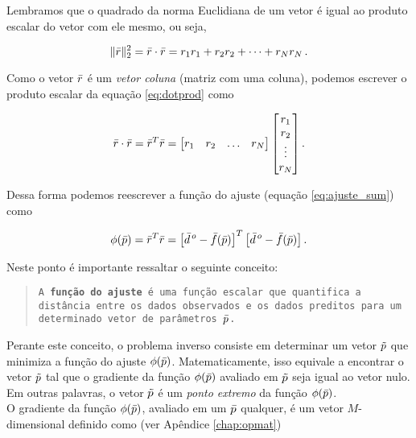 \indent Lembramos que o quadrado da norma Euclidiana de um vetor é igual ao
produto escalar do vetor com ele mesmo, ou seja,

\begin{equation}
\lVert\bar{r}\rVert_2^2 = \bar{r} \cdot \bar{r} =
    r_1r_1 + r_2r_2 + \dotsb + r_Nr_N \thinspace .
\label{eq:dotprod}
\end{equation}

\noindent Como o vetor $\bar{r}$ é um {\it vetor coluna} (matriz com uma
coluna), podemos escrever o produto escalar da equação \ref{eq:dotprod} como

\begin{equation}
\bar{r} \cdot \bar{r} = \bar{r}^T \bar{r} =
    \begin{bmatrix}
        r_1 & r_2 & \ldots & r_N
    \end{bmatrix}
    \begin{bmatrix}
        r_1 \\ r_2 \\ \vdots \\ r_N
    \end{bmatrix} .
\label{eq:vectdotprod}
\end{equation}

\noindent Dessa forma podemos reescrever a função do ajuste (equação
\ref{eq:ajuste_sum}) como

\begin{equation}
\phi(\bar{p}) = \bar{r}^T \bar{r} =
    \left[\bar{d}^{\thinspace o} - \bar{f}(\bar{p})\right]^T
    \left[\bar{d}^{\thinspace o} - \bar{f}(\bar{p})\right] .
\label{eq:ajuste}
\end{equation}

\indent Neste ponto é importante ressaltar o seguinte conceito:

\begin{quote}
{\tt A {\bf função do ajuste} é uma função escalar que
quantifica a dis\-tân\-cia entre os dados observados e os dados preditos para um
de\-ter\-mi\-na\-do vetor de parâmetros $\bar{p}$.}
\end{quote}

\indent Perante este conceito, o problema inverso consiste em determinar um
vetor $\tilde{p}$ que minimiza a função do ajuste $\phi(\bar{p})$. 
Matematicamente, isso equivale a encontrar o vetor $\tilde{p}$ tal que o gradiente
da função $\phi(\bar{p})$ avaliado em $\tilde{p}$ seja igual ao vetor nulo.
Em outras palavras, o vetor $\tilde{p}$ é um {\it ponto extremo} da função
$\phi(\bar{p})$.
\\
\indent O gradiente da função $\phi(\bar{p})$, avaliado em um $\bar{p}$ qualquer,
é um vetor $M$-dimensional definido como (ver Apêndice \ref{chap:opmat})

